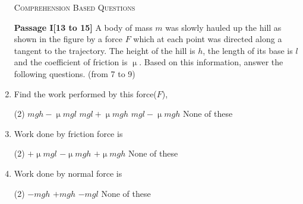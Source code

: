 \documentclass{article}
\renewcommand{\ans}{\quad}
\begin{document}
\begin{enumerate}
    \begin{center}
        \textsc{Comprehension Based Questions}
    \end{center}
    {\textbf{Passage I[13 to 15]}}
    A body of mass $m$ was slowly hauled up the hill as shown in the figure by a force $F$ which at each point was directed along a tangent to the trajectory. The height of the hill is $h$, the length of its base is $l$ and the coefficient of friction is $\upmu$. Based on this information, answer the following questions. (from 7 to 9)
    \begin{center}
    \end{center}
    \item Find the work performed by this force($F$),
    \begin{tasks}(2)
        \task $mgh-\upmu mgl$
        \task $mgl+\upmu mgh$
        \task $mgl-\upmu mgh$
        \task None of these\ans
    \end{tasks}

    \item Work done by friction force is
    \begin{tasks}(2)
        \task $+\upmu mgl$
        \task $-\upmu mgh$
        \task $+\upmu mgh$
        \task None of these\ans
    \end{tasks}

    \item Work done by normal force is
    \begin{tasks}(2)
        \task $-mgh$
        \task $+mgh$
        \task $-mgl$
        \task None of these\ans
    \end{tasks}


\end{enumerate}
\end{document}
